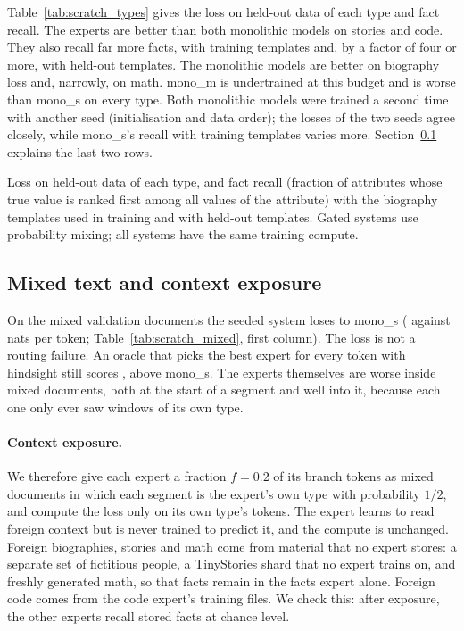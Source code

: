\documentclass[10pt]{article}
\newcommand{\pending}[1]{{\color{red}\textbf{[#1]}}}
\begin{document}
Table~\ref{tab:scratch_types} gives the loss on held-out data of each type and fact recall. The
experts are better than both monolithic models on stories and code. They also recall far more
facts, with training templates and, by a factor of four or more, with held-out templates. The
monolithic models are better on biography loss and, narrowly, on math. mono\_m is undertrained at this budget and is worse than mono\_s on every
type. Both monolithic models were trained a second time with another seed (initialisation and
data order); the losses of the two seeds agree closely, while mono\_s's recall with training
templates varies more. Section~\ref{sec:scratch_context} explains the last two rows.
\begin{table}[t]
\centering\small
\caption{Loss on held-out data of each type, and fact recall (fraction of attributes whose true
value is ranked first among all values of the attribute) with the biography templates used in training and with held-out templates. Gated
systems use probability mixing; all systems have the same training compute.}
\label{tab:scratch_types}
\IfFileExists{tables/track_c_types.tex}{}{\pending{table}}
\end{table}

\subsection{Mixed text and context exposure}
\label{sec:scratch_context}

On the mixed validation documents the seeded system loses to mono\_s
(\resTrackCMixedMixedSeeded{} against \resTrackCMixedMixedMonoS{} nats per token;
Table~\ref{tab:scratch_mixed}, first column). The loss is not a routing failure. An oracle that
picks the best expert for every token with hindsight still scores \resTrackCOracleTokenSeeded,
above mono\_s. The experts themselves are worse inside mixed documents, both at the start of a
segment and well into it, because each one only ever saw windows of its own type.

\paragraph{Context exposure.} We therefore give each expert a fraction $f=0.2$ of its branch
tokens as mixed documents in which each segment is the expert's own type with probability
$1/2$, and compute the loss only on its own type's tokens. The expert learns to read foreign
context but is never trained to predict it, and the compute is unchanged. Foreign biographies,
stories and math come from material that no expert stores: a separate set of fictitious people,
a TinyStories shard that no expert trains on, and freshly generated math, so that
facts remain in the facts expert alone. Foreign code comes from the code expert's training files. We check this: after exposure, the other experts recall
stored facts at chance level.
\end{document}
